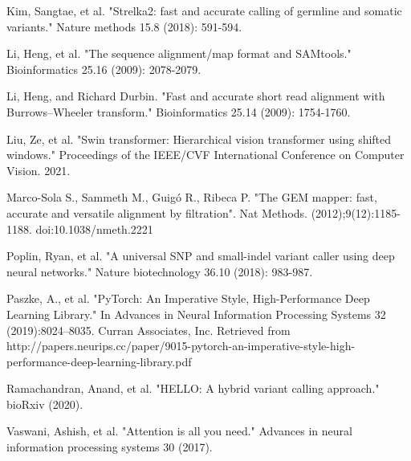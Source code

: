 \documentclass[]{article}
\begin{document}
\vspace{8pt}
Kim, Sangtae, et al. "Strelka2: fast and accurate calling of germline and somatic variants." Nature methods 15.8 (2018): 591-594.

\vspace{8pt}
Li, Heng, et al. "The sequence alignment/map format and SAMtools." Bioinformatics 25.16 (2009): 2078-2079.

\vspace{8pt}
Li, Heng, and Richard Durbin. "Fast and accurate short read alignment with Burrows–Wheeler transform." Bioinformatics 25.14 (2009): 1754-1760.

\vspace{8pt}
Liu, Ze, et al. "Swin transformer: Hierarchical vision transformer using shifted windows." Proceedings of the IEEE/CVF International Conference on Computer Vision. 2021.

\vspace{8pt}
Marco-Sola S., Sammeth M., Guigó R., Ribeca P. "The GEM mapper: fast, accurate and versatile alignment by filtration". Nat Methods. (2012);9(12):1185-1188. doi:10.1038/nmeth.2221

\vspace{8pt}
Poplin, Ryan, et al. "A universal SNP and small-indel variant caller using deep neural networks." Nature biotechnology 36.10 (2018): 983-987.
 
\vspace{8pt}
Paszke, A., et al. "PyTorch: An Imperative Style, High-Performance Deep Learning Library." In Advances in Neural Information Processing Systems 32 (2019):8024–8035. Curran Associates, Inc. Retrieved from http://papers.neurips.cc/paper/9015-pytorch-an-imperative-style-high-performance-deep-learning-library.pdf

\vspace{8pt}
Ramachandran, Anand, et al. "HELLO: A hybrid variant calling approach." bioRxiv (2020).
 

\vspace{8pt}
Vaswani, Ashish, et al. "Attention is all you need." Advances in neural information processing systems 30 (2017).
\end{document}
